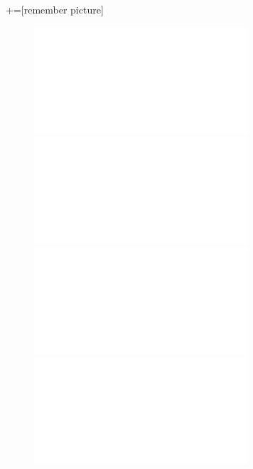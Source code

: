 \documentclass[9pt,xcolor=svgnames]{beamer}
\begin{document}
+=[remember picture]
\everymath{\displaystyle}



\begin{frame}
 \thispagestyle{empty}
 
 \begin{figure}[t]
  \centering
  \includegraphics<1>[scale=0.7]{../Imagenes/logo_1.pdf}
  \includegraphics<2>[scale=0.7]{../Imagenes/logo_2.pdf}
  \includegraphics<3>[scale=0.7]{../Imagenes/logo_3.pdf}
  \includegraphics<4>[scale=0.7]{../Imagenes/logo_4.pdf}
 \end{figure}
\end{frame}




\begin{frame}
 \titlepage
\end{frame}

\normalsize
\end{document}
